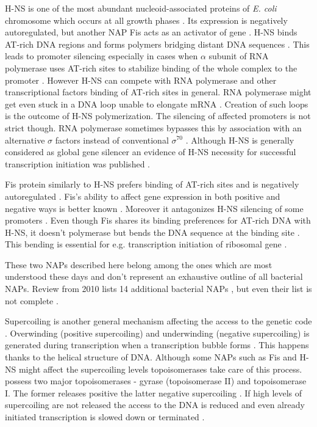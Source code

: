 H-NS is one of the most abundant nucleoid-associated proteins of \textit{E. coli} chromosome which occurs at all growth phases \cite{azam1999growth}.
Its expression is negatively autoregulated, but another NAP Fis acts as an activator of  gene \cite{ueguchi1993autoregulatory, falconi1996antagonistic}.
H-NS binds AT-rich DNA regions and forms polymers bridging distant DNA sequences  \cite{navarre2006selective, arold2010h}.
This leads to promoter silencing especially in cases when $\alpha$ subunit of RNA polymerase uses AT-rich sites to stabilize binding of the whole complex to the promoter \cite{singh2013h}.
However H-NS can compete with RNA polymerase and other transcriptional factors binding of AT-rich sites in general.
RNA polymerase might get even stuck in a DNA loop unable to elongate mRNA \cite{dame2002structural}.
Creation of such loops is the outcome of H-NS polymerization.
The silencing of affected promoters is not strict though.
RNA polymerase sometimes bypasses this by association with an alternative $\sigma$ factors instead of conventional $\sigma^{70}$ \cite{grainger2008selective}.
Although H-NS is generally considered as global gene silencer an evidence of H-NS necessity for successful transcription initiation was published \cite{singh2013h}.

Fis protein similarly to H-NS prefers binding of AT-rich sites and is negatively autoregulated \cite{ball1992dramatic, stella2010shape}.
Fis's ability to affect gene expression in both positive and negative ways is better known \cite{choi2005effects, karambelkar2012silencing}.
Moreover it antagonizes H-NS silencing of some promoters \cite{falconi2001involvement}.
Even though Fis shares its binding preferences for AT-rich DNA with H-NS, it doesn't polymerase but bends the DNA sequence at the binding site \cite{hubner1989bent}.
This bending is essential for e.g. transcription initiation of ribosomal gene  \cite{gosink1993dna}.

These two NAPs described here belong among the ones which are most understood these days and don't represent an exhaustive outline of all bacterial NAPs.
Review from 2010 lists 14 additional bacterial NAPs \cite{dillon2010bacterial}, but even their list is not complete \cite{aznar2013hha}.

Supercoiling is another general mechanism affecting the access to the genetic code \cite{brahms1985activation}.
Overwinding (positive supercoiling) and underwinding (negative supercoiling) is generated during transcription when a transcription bubble forms \cite{wu1988transcription}.
This happens thanks to the helical structure of DNA.
Although some NAPs such as Fis and H-NS might affect the supercoiling levels \cite{ouafa2012nucleoid} topoisomerases take care of this process.
 possess two major topoisomerases - gyrase (topoisomerase II) and topoisomerase I.
The former releases positive the latter negative supercoiling \cite{wang1971interaction, gellert1976dna}.
If high levels of supercoiling are not released the access to the DNA is reduced and even already initiated transcription is slowed down or terminated \cite{chong2014mechanism}.

